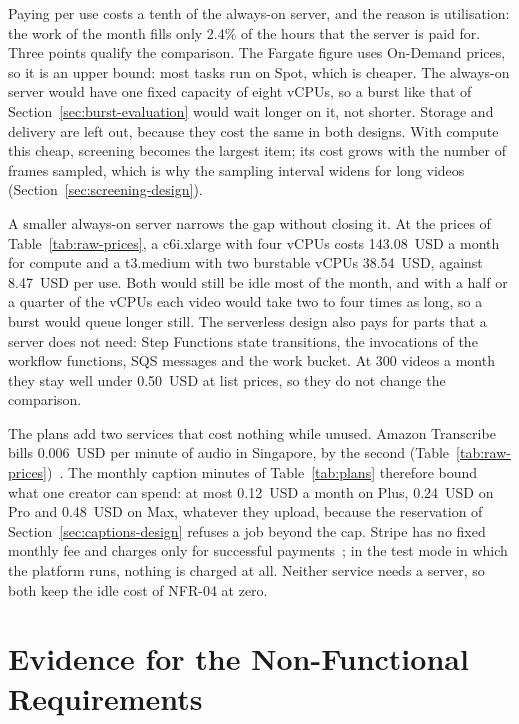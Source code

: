 Paying per use costs a tenth of the always-on server, and the reason is utilisation: the work of the
month fills only 2.4\% of the hours that the server is paid for. Three points qualify the comparison.
The Fargate figure uses On-Demand prices, so it is an upper bound: most tasks run on Spot, which is
cheaper. The always-on server would have one fixed capacity of eight vCPUs, so a burst like that of
Section~\ref{sec:burst-evaluation} would wait longer on it, not shorter. Storage and delivery are
left out, because they cost the same in both designs. With compute this cheap, screening becomes the
largest item; its cost grows with the number of frames sampled, which is why the sampling interval
widens for long videos (Section~\ref{sec:screening-design}).

A smaller always-on server narrows the gap without closing it. At the prices of
Table~\ref{tab:raw-prices}, a c6i.xlarge with four vCPUs costs 143.08~USD a month for compute and a
t3.medium with two burstable vCPUs 38.54~USD, against 8.47~USD per use. Both would still be idle
most of the month, and with a half or a quarter of the vCPUs each video would take two to four times
as long, so a burst would queue longer still. The serverless design also pays for parts that a
server does not need: Step Functions state transitions, the invocations of the workflow functions,
SQS messages and the work bucket. At 300 videos a month they stay well under 0.50~USD at list
prices, so they do not change the comparison.

The plans add two services that cost nothing while unused. Amazon Transcribe bills 0.006~USD per
minute of audio in Singapore, by the second (Table~\ref{tab:raw-prices})~\cite{awstranscribepricing}.
The monthly caption minutes of Table~\ref{tab:plans} therefore bound what one creator can spend: at
most 0.12~USD a month on Plus, 0.24~USD on Pro and 0.48~USD on Max, whatever they upload, because the
reservation of Section~\ref{sec:captions-design} refuses a job beyond the cap. Stripe has no fixed
monthly fee and charges only for successful payments~\cite{stripepricing}; in the test mode in which
the platform runs, nothing is charged at all. Neither service needs a server, so both keep the idle
cost of NFR-04 at zero.

\section{Evidence for the Non-Functional Requirements}
\label{sec:nfr-evidence}

